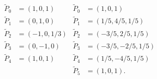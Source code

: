 \documentclass[a4paper,12pt]{article}
\begin{document}

\begin{align*}
\tilde{P}_0 &= (1,0, 1) & \tilde{P}_0 &= (1,0, 1)\\
\tilde{P}_1 &= (0, 1, 0) &\tilde{P}_1 &= (1/5, 4/5, 1/5)\\
\tilde{P}_2 &= (-1, 0, 1/3) &\tilde{P}_2 &= (-3/5, 2/5, 1/5)\\
\tilde{P}_3 &= (0, -1, 0) &\tilde{P}_3 &= (-3/5, -2/5, 1/5)\\
\tilde{P}_4 &= (1, 0, 1) & \tilde{P}_4 &= (1/5, -4/5, 1/5)\\
& & \tilde{P}_5 &= (1, 0, 1).
\end{align*}
\end{document}

